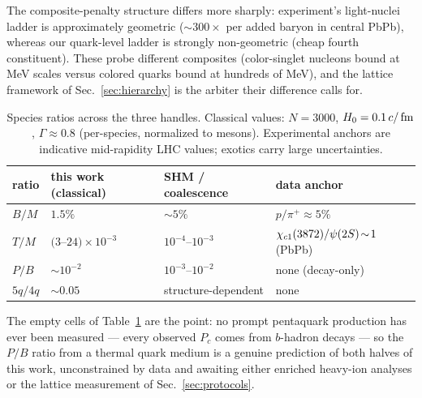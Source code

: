 The composite-penalty structure differs more sharply: experiment's
light-nuclei ladder is approximately geometric ($\sim300\times$ per
added baryon in central PbPb), whereas our quark-level ladder is
strongly non-geometric (cheap fourth constituent).  These probe
different composites (color-singlet nucleons bound at MeV scales
versus colored quarks bound at hundreds of MeV), and the lattice
framework of Sec.~\ref{sec:hierarchy} is the arbiter their difference
calls for.

\begin{table}[t]
\caption{Species ratios across the three handles.  Classical values:
$N=3000$, $H_0=0.1\,c/\,\mathrm{fm}$, $\Gamma\approx0.8$ (per-species,
normalized to mesons).  Experimental anchors are indicative
mid-rapidity LHC values; exotics carry large uncertainties.}
\label{tab:ratios}
\begin{ruledtabular}
\begin{tabular}{llll}
ratio & this work (classical) & SHM / coalescence & data anchor \\
\hline
$B/M$ & $1.5\%$ & $\sim5\%$ \cite{Andronic:2017pug} & $p/\pi^+\!\approx\!5\%$ \\
$T/M$ & $(3$--$24)\times10^{-3}$\footnotemark[1] & $10^{-4}$--$10^{-3}$ \cite{ExHIC:2017smd} &
$\chi_{c1}(3872)/\psi(2S)\!\sim\!1$ (PbPb) \cite{CMS:2021znk} \\
$P/B$ & $\sim10^{-2}$ & $10^{-3}$--$10^{-2}$ \cite{ExHIC:2017smd} &
none (decay-only) \\
$5q/4q$ & $\sim0.05$ & structure-dependent & none \\
\end{tabular}
\end{ruledtabular}
\end{table}

The empty cells of Table~\ref{tab:ratios} are the point: no prompt
pentaquark production has ever been measured --- every observed $P_c$
comes from $b$-hadron decays --- so the $P/B$ ratio from a thermal
quark medium is a genuine prediction of both halves of this work,
unconstrained by data and awaiting either enriched heavy-ion analyses
or the lattice measurement of Sec.~\ref{sec:protocols}.
